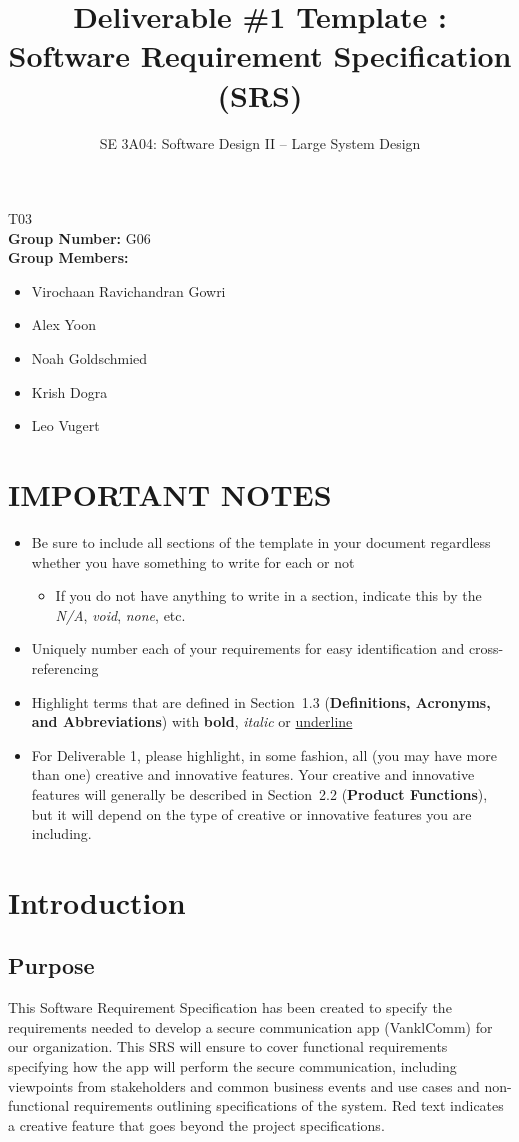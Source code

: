 \documentclass[]{article}
\title{Deliverable \#1 Template : Software Requirement Specification (SRS)}
\author{SE 3A04: Software Design II -- Large System Design}
\date{}
\begin{document}
\maketitle
{} T03\\
{\bf Group Number:} G06 \\
{\bf Group Members:}
\begin{itemize}
	\item Virochaan Ravichandran Gowri
	\item Alex Yoon
	\item Noah Goldschmied
	\item Krish Dogra
	\item Leo Vugert
\end{itemize}

\section*{IMPORTANT NOTES}
\begin{itemize}
	\item Be sure to include all sections of the template in your document regardless whether you have something to write for each or not
	      \begin{itemize}
		      \item If you do not have anything to write in a section, indicate this by the \emph{N/A}, \emph{void}, \emph{none}, etc.
	      \end{itemize}
	\item Uniquely number each of your requirements for easy identification and cross-referencing
	\item Highlight terms that are defined in Section~1.3 (\textbf{Definitions, Acronyms, and Abbreviations}) with \textbf{bold}, \emph{italic} or \underline{underline}
	\item For Deliverable 1, please highlight, in some fashion, all (you may have more than one) creative and innovative features. Your creative and innovative features will generally be described in Section~2.2 (\textbf{Product Functions}), but it will depend on the type of creative or innovative features you are including.
\end{itemize}

\newpage
\section{Introduction}
\label{sec:introduction}

\subsection{Purpose}
\label{sub:purpose}
This Software Requirement Specification has been created to specify the requirements needed to develop a secure communication app (VanklComm) for our organization. This SRS will ensure to cover functional requirements specifying how the app will perform the secure communication, including viewpoints from stakeholders and common business events and use cases and non-functional requirements outlining specifications of the system. Red text indicates a creative feature that goes beyond the project specifications.
\end{document}
